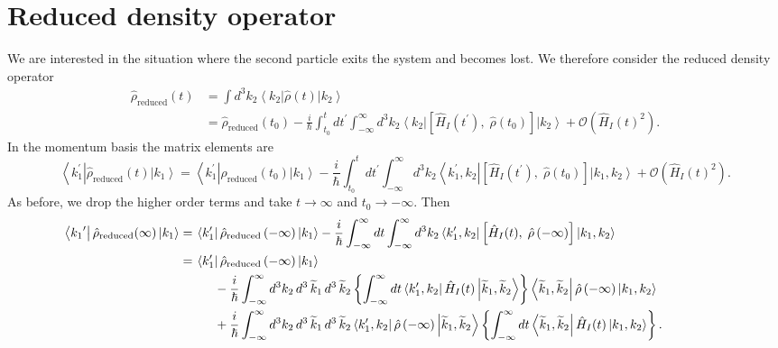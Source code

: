 \documentclass[11pt]{article}
\newcommand{\Od}[1]{\mathcal{O}{\left(#1\right)}}
\newcommand{\bra}[1]{\left\langle#1\right|}
\newcommand{\ket}[1]{\left|#1\right\rangle}
\newcommand{\op}[1]{\hat{#1}}
\theoremstyle{theorem}
\theoremstyle{remark}
\theoremstyle{step}
\theoremstyle{gap}
\begin{document}
\section{Reduced density operator}

We are interested in the situation where the second particle exits the system and becomes lost. We therefore consider the reduced density operator
\begin{align*}
\op{\rho}_\text{reduced}(t) &= \int d^3k_2 \bra{k_2} \op{\rho}(t) \ket{k_2} \nonumber\\
&= \op{\rho}_\text{reduced}\left(t_0\right) -  \frac{i}{\hbar} \int_{t_0}^tdt^\prime\int_{-\infty}^\infty d^3k_2\bra{k_2}\left[\op{H}_I(t^\prime),\; \op{\rho}\left(t_0\right)\right]\ket{k_2} + \Od{\op{H}_I(t)^2}.
\end{align*}
In the momentum basis the matrix elements are
\[
\bra{k_1^\prime}\op{\rho}_\text{reduced}(t)\ket{k_1} = \bra{k_1^\prime}\op{\rho}_\text{reduced}\left(t_0\right)\ket{k_1} -  \frac{i}{\hbar} \int_{t_0}^tdt^\prime\int_{-\infty}^\infty d^3k_2 \bra{k_1^\prime, k_2}\left[\op{H}_I(t^\prime),\; \op{\rho}\left(t_0\right)\right]\ket{k_1, k_2} + \Od{\op{H}_I(t)^2}.
\]
As before, we drop the higher order terms and take \(t \to \infty\) and \(t_0 \to -\infty\). Then
\begin{align*}
\hspace{-5em}\bra{{k_1}^\prime}\op{\rho}_\text{reduced}(\infty)\ket{k_1} =\hspace{1.7em}&\hspace{-1.5em} \bra{k_1^\prime}\op{\rho}_\text{reduced}\left(-\infty\right)\ket{k_1} -  \frac{i}{\hbar} \int_{-\infty}^\infty dt \int_{-\infty}^\infty d^3k_2 \bra{k_1^\prime, k_2}\left[\op{H}_I(t),\; \op{\rho}\left(-\infty\right)\right]\ket{k_1, k_2} 
\\=\hspace{1.7em}&\hspace{-1.5em}
\bra{k_1^\prime}\op{\rho}_\text{reduced}\left(-\infty\right)\ket{k_1}
\\&-  \frac{i}{\hbar} \int_{-\infty}^\infty d^3k_2 \,d^3\,\widetilde{k}_1\,d^3\,\widetilde{k}_2 \left\{\int_{-\infty}^\infty dt \bra{k_1^\prime, k_2}\op{H}_I(t) \ket{\widetilde{k}_1, \widetilde{k}_2}
\right\}\bra{\widetilde{k}_1, \widetilde{k}_2}\op{\rho}\left(-\infty\right)\ket{k_1, k_2}
\\&+  \frac{i}{\hbar} \int_{-\infty}^\infty d^3k_2\,d^3\,\widetilde{k}_1\,d^3\,\widetilde{k}_2 \bra{k_1^\prime, k_2} \op{\rho}\left(-\infty\right)
\ket{\widetilde{k}_1, \widetilde{k}_2}\left\{\int_{-\infty}^\infty dt\bra{\widetilde{k}_1, \widetilde{k}_2}\op{H}_I(t)\ket{k_1, k_2}\right\}.\end{align*}
\end{document}
